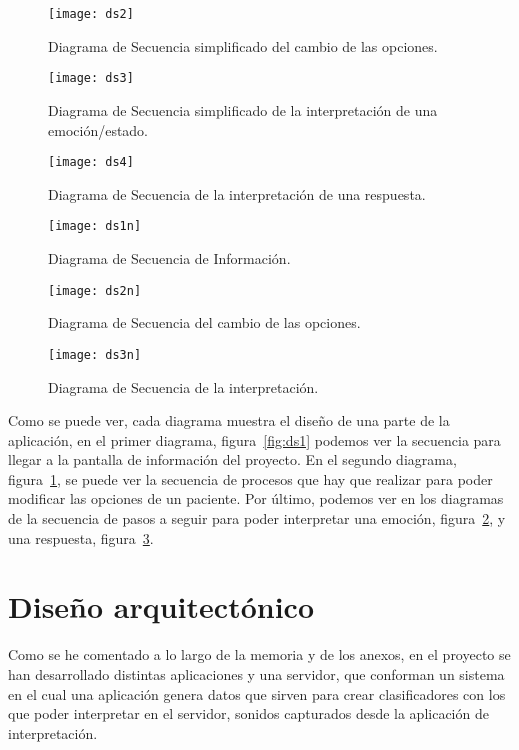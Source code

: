 \begin{figure}[htp]
	\centering
	\texttt{[image: ds2]}
	\caption{Diagrama de Secuencia simplificado del cambio de las opciones.}
	\label{fig:ds2}
\end{figure}

\begin{figure}[htp]
	\centering
	\texttt{[image: ds3]}
	\caption{Diagrama de Secuencia simplificado de la interpretación de una emoción/estado.}
	\label{fig:ds3}
\end{figure}

\begin{figure}[htp]
	\centering
	\texttt{[image: ds4]}
	\caption{Diagrama de Secuencia de la interpretación de una respuesta.}
	\label{fig:ds4}
\end{figure}

\begin{figure}[htp]
	\centering
	\texttt{[image: ds1n]}
	\caption{Diagrama de Secuencia de Información.}
	\label{fig:ds1n}
\end{figure}

\begin{figure}[htp]
	\centering
	\texttt{[image: ds2n]}
	\caption{Diagrama de Secuencia del cambio de las opciones.}
	\label{fig:ds2n}
\end{figure}

\begin{figure}[H]
	\centering
	\texttt{[image: ds3n]}
	\caption{Diagrama de Secuencia de la interpretación.}
	\label{fig:ds3n}
\end{figure}

Como se puede ver, cada diagrama muestra el diseño de una parte de la aplicación, en el primer diagrama, figura~\ref{fig:ds1} podemos ver la secuencia para llegar a la pantalla de información del proyecto. En el segundo diagrama, figura~\ref{fig:ds2}, se puede ver la secuencia de procesos que hay que realizar para poder modificar las opciones de un paciente. Por último, podemos ver en los diagramas de la secuencia de pasos a seguir para poder interpretar una emoción, figura~\ref{fig:ds3}, y una respuesta, figura~\ref{fig:ds4}. 
\section{Diseño arquitectónico}

Como se he comentado a lo largo de la memoria y de los anexos, en el proyecto se han desarrollado distintas aplicaciones y una servidor, que conforman un sistema en el cual una aplicación genera datos que sirven para crear clasificadores con los que poder interpretar en el servidor, sonidos capturados desde la aplicación de interpretación.

